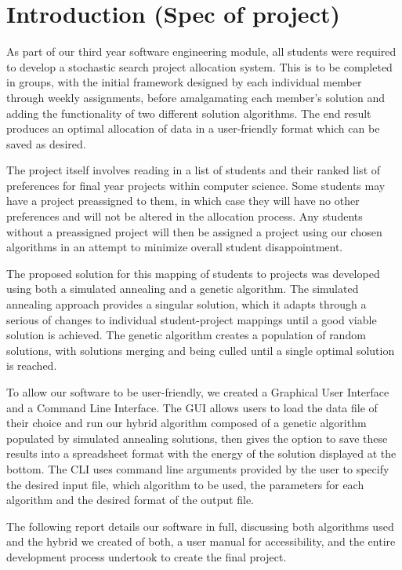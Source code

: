 \documentclass{article}
\newcommand{\enterProblemHeader}[1]{
\nobreak\extramarks{#1}{#1}\nobreak
\nobreak\extramarks{#1}{#1}\nobreak
}
\newcommand{\exitProblemHeader}[1]{
\nobreak\extramarks{#1}{#1 continued on next page\ldots}\nobreak
\nobreak\extramarks{#1}{}\nobreak
}
\newcounter{homeworkProblemCounter} %
\newcommand{\homeworkProblemName}{}
\newenvironment{homeworkProblem}[1][
 \arabic{homeworkProblemCounter}]{ %
\stepcounter{homeworkProblemCounter} %
\renewcommand{\homeworkProblemName}{#1} %
\section{\homeworkProblemName} %
\enterProblemHeader{} %
}{
\exitProblemHeader{} %
}
\begin{document}
\begin{homeworkProblem}[Introduction (Spec of project)]
As part of our third year software engineering module, all students were required to develop a stochastic search project allocation system. This is to be completed in groups,  with the initial framework designed by each individual member through weekly assignments, before amalgamating each member's solution and adding the functionality of two different solution algorithms. The end result produces an optimal allocation of data in a user-friendly format which can be saved as desired.

The project itself involves reading in a list of students and their ranked list of preferences for final year projects within computer science. Some students may have a project preassigned to them, in which case they will have no other preferences and will not be altered in the allocation process. Any students without a preassigned project will then be assigned a project using our chosen algorithms in an attempt to minimize overall student disappointment. 

The proposed solution for this mapping of students to projects was developed using both a simulated annealing and a genetic algorithm. The simulated annealing approach provides a singular solution, which it adapts through a serious of changes to individual student-project mappings until a good viable solution is achieved. The genetic algorithm creates a population of random solutions, with solutions merging and being culled until a single optimal solution is reached. 

To allow our software to be user-friendly, we created a Graphical User Interface and a Command Line Interface. The GUI allows users to load the data file of their choice and run our hybrid algorithm composed of a genetic algorithm populated by simulated annealing solutions, then gives the option to save these results into a spreadsheet format with the energy of the solution displayed at the bottom. The CLI uses command line arguments provided by the user to specify the desired input file, which algorithm to be used, the parameters for each algorithm and the desired format of the output file.

The following report details our software in full, discussing both algorithms used and the hybrid we created of both, a user manual for accessibility, and the entire development process undertook to create the final project.









\end{homeworkProblem}
\newpage
\end{document}
